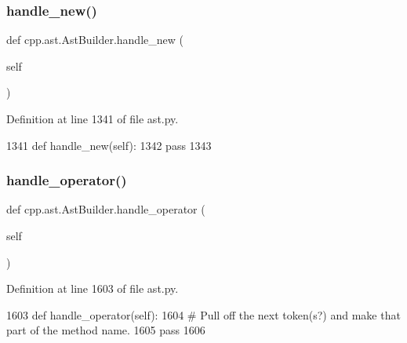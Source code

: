 \mbox{\label{classcpp_1_1ast_1_1AstBuilder_a86f5769e0460524691ae0d135d30f101}} 
\subsubsection{\texorpdfstring{handle\+\_\+new()}{handle\_new()}}
{\footnotesize\ttfamily def cpp.\+ast.\+Ast\+Builder.\+handle\+\_\+new (\begin{DoxyParamCaption}\item[{}]{self }\end{DoxyParamCaption})}



Definition at line 1341 of file ast.\+py.


\begin{DoxyCode}
1341     \textcolor{keyword}{def }handle\_new(self):
1342         \textcolor{keywordflow}{pass}
1343 
\end{DoxyCode}
\mbox{\label{classcpp_1_1ast_1_1AstBuilder_a7ca1318675b9eff41cb4a838d63eb6e6}} 
\subsubsection{\texorpdfstring{handle\+\_\+operator()}{handle\_operator()}}
{\footnotesize\ttfamily def cpp.\+ast.\+Ast\+Builder.\+handle\+\_\+operator (\begin{DoxyParamCaption}\item[{}]{self }\end{DoxyParamCaption})}



Definition at line 1603 of file ast.\+py.


\begin{DoxyCode}
1603     \textcolor{keyword}{def }handle\_operator(self):
1604         \textcolor{comment}{# Pull off the next token(s?) and make that part of the method name.}
1605         \textcolor{keywordflow}{pass}
1606 
\end{DoxyCode}
\mbox{\label{classcpp_1_1ast_1_1AstBuilder_a8bc5f9563f5ead3abba5a71187162867}} 

